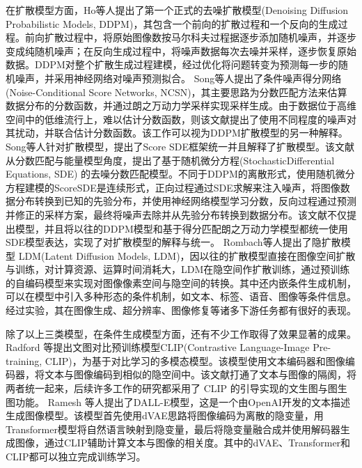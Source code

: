 \par
在扩散模型方面，Ho\cite{hoDenoisingDiffusionProbabilistic2020}等人提出了第一个正式的去噪扩散模型(Denoising Diffusion Probabilistic Models, DDPM)，其包含一个前向的扩散过程和一个反向的生成过程。前向扩散过程中，将原始图像数按马尔科夫过程据逐步添加随机噪声，并逐步变成纯随机噪声；在反向生成过程中，将噪声数据每次去噪并采样，逐步恢复原始数据。DDPM对整个扩散生成过程建模，经过优化将问题转变为预测每一步的随机噪声，并采用神经网络对噪声预测拟合。
Song\cite{songGenerativeModelingEstimating2019}等人提出了条件噪声得分网络(Noise-Conditional Score Networks, NCSN)，其主要思路为分数匹配方法来估算数据分布的分数函数，并通过朗之万动力学采样实现采样生成。由于数据位于高维空间中的低维流行上，难以估计分数函数，则该文献提出了使用不同程度的噪声对其扰动，并联合估计分数函数。该工作可以视为DDPM扩散模型的另一种解释。
Song\cite{songScoreBasedGenerativeModeling2021}等人针对扩散模型，提出了Score SDE框架统一并且解释了扩散模型。该文献从分数匹配与能量模型角度，提出了基于随机微分方程(StochasticDifferential Equations, SDE) 的去噪分数匹配模型。不同于DDPM的离散形式，使用随机微分方程建模的ScoreSDE是连续形式，正向过程通过SDE求解来注入噪声，将图像数据分布转换到已知的先验分布，并使用神经网络模型学习分数，反向过程通过预测并修正的采样方案，最终将噪声去除并从先验分布转换到数据分布。该文献不仅提出模型，并且将以往的DDPM模型和基于得分匹配朗之万动力学模型都统一使用SDE模型表达，实现了对扩散模型的解释与统一。
Rombach\cite{rombachHighResolutionImageSynthesis2022}等人提出了隐扩散模型 LDM(Latent Diffusion Models, LDM)，因以往的扩散模型直接在图像空间扩散与训练，对计算资源、运算时间消耗大，LDM在隐空间作扩散训练，通过预训练的自编码模型来实现对图像像素空间与隐空间的转换。其中还内嵌条件生成机制，可以在模型中引入多种形态的条件机制，如文本、标签、语音、图像等条件信息。经过实验，其在图像生成、超分辨率、图像修复等诸多下游任务都有很好的表现。
\par
除了以上三类模型，在条件生成模型方面，还有不少工作取得了效果显著的成果。Radford \cite{pmlr-v139-radford21a}等提出文图对比预训练模型CLIP(Contrastive Language-Image Pre-training, CLIP)，为基于对比学习的多模态模型。该模型使用文本编码器和图像编码器，将文本与图像编码到相似的隐空间中。该文献打通了文本与图像的隔阂，将两者统一起来，后续许多工作的研究都采用了 CLIP 的引导实现的文生图与图生图功能。
Ramesh \cite{pmlr-v139-ramesh21a}等人提出了DALL-E模型，这是一个由OpenAI开发的文本描述生成图像模型。该模型首先使用dVAE思路将图像编码为离散的隐变量，用Transformer模型将自然语言映射到隐变量，最后将隐变量融合成并使用解码器生成图像，通过CLIP辅助计算文本与图像的相关度。其中的dVAE、Transformer和CLIP都可以独立完成训练学习。

